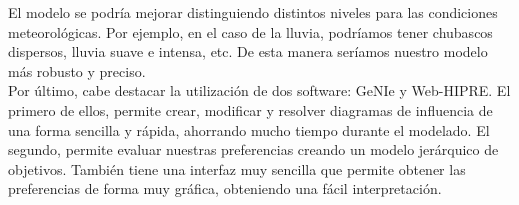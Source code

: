 \documentclass[12pt,a4paper,twoside,openright,titlepage,final]{article}
\begin{document}
El modelo se podría mejorar distinguiendo distintos niveles para las condiciones meteorológicas. Por ejemplo, en el caso de la lluvia, podríamos tener chubascos dispersos, lluvia suave e intensa, etc. De esta manera seríamos nuestro modelo más robusto y preciso.\\

Por último, cabe destacar la utilización de dos software: GeNIe y Web-HIPRE. El primero de ellos, permite crear, modificar y resolver diagramas de influencia de una forma sencilla y rápida, ahorrando mucho tiempo durante el modelado. El segundo, permite evaluar nuestras preferencias creando un modelo jerárquico de objetivos. También tiene una interfaz muy sencilla que permite obtener las preferencias de forma muy gráfica, obteniendo una fácil interpretación.  
\end{document}
